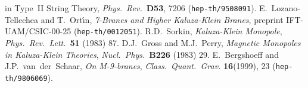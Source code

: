 \documentclass[12pt,a4paper]{article}
\begin{document}
\begin{thebibliography}{50}
{             in Type~II String Theory},
        {\it Phys.~Rev.}~{\bf D53}, 7206 ({\tt hep-th/9508091}).
%
 E.~Lozano-Tellechea and T.~Ort\'{\i}n,
        {\sl 7-Branes and Higher Kaluza-Klein Branes},
        preprint IFT-UAM/CSIC-00-25 ({\tt hep-th/0012051}).
%
 R.D.~Sorkin, 
        {\sl Kaluza-Klein Monopole},
        {\it Phys.~Rev.~Lett.}~{\bf 51} (1983) 87.
%
  D.J.~Gross and M.J.~Perry, 
        {\sl Magnetic Monopoles in Kaluza-Klein Theories},
        {\it Nucl.~Phys.}~{\bf B226} (1983) 29.
%
 E.~Bergshoeff and J.P.~van~der~Schaar,
        {\sl On M-9-branes},
        {\it Class.~Quant.~Grav.} {\bf 16}(1999), 23
        ({\tt hep-th/9806069}).

\end{thebibliography}
\end{document}
